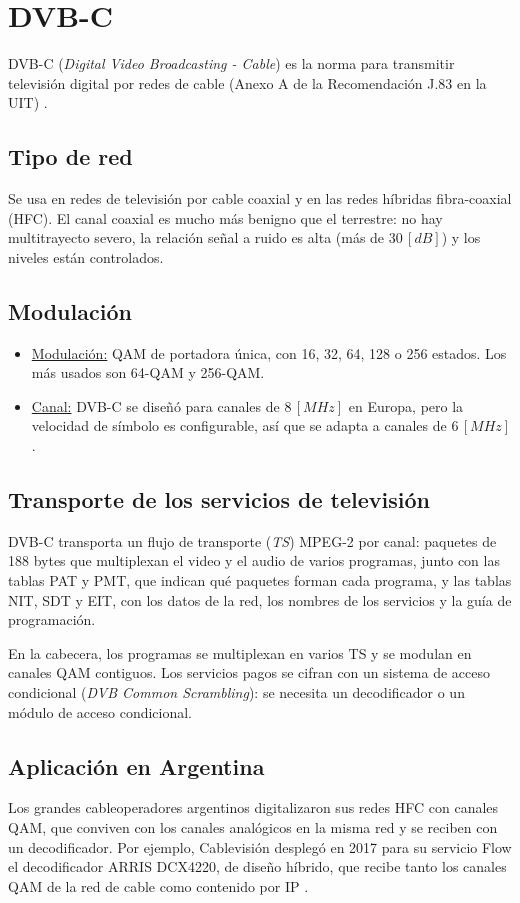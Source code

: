 \section{DVB-C}
\label{sec:dvbc}

DVB-C (\textit{Digital Video Broadcasting - Cable}) es la norma para transmitir televisión digital por redes de cable (Anexo A de la Recomendación J.83 en la UIT) \cite{itu_j83}.

\subsection{Tipo de red}
Se usa en redes de televisión por cable coaxial y en las redes híbridas fibra-coaxial (HFC). El canal coaxial es mucho más benigno que el terrestre: no hay multitrayecto severo, la relación señal a ruido es alta (más de $30 \, [dB]$) y los niveles están controlados.

\subsection{Modulación}
\begin{itemize}
    \item \underline{Modulación:} QAM de portadora única, con 16, 32, 64, 128 o 256 estados. Los más usados son 64-QAM y 256-QAM.
    \item \underline{Canal:} DVB-C se diseñó para canales de $8 \, [MHz]$ en Europa, pero la velocidad de símbolo es configurable, así que se adapta a canales de $6 \, [MHz]$.
\end{itemize}

\subsection{Transporte de los servicios de televisión}
DVB-C transporta un flujo de transporte (\textit{TS}) MPEG-2 por canal: paquetes de 188 bytes que multiplexan el video y el audio de varios programas, junto con las tablas PAT y PMT, que indican qué paquetes forman cada programa, y las tablas NIT, SDT y EIT, con los datos de la red, los nombres de los servicios y la guía de programación.

En la cabecera, los programas se multiplexan en varios TS y se modulan en canales QAM contiguos. Los servicios pagos se cifran con un sistema de acceso condicional (\textit{DVB Common Scrambling}): se necesita un decodificador o un módulo de acceso condicional.

\subsection{Aplicación en Argentina}
Los grandes cableoperadores argentinos digitalizaron sus redes HFC con canales QAM, que conviven con los canales analógicos en la misma red y se reciben con un decodificador. Por ejemplo, Cablevisión desplegó en 2017 para su servicio Flow el decodificador ARRIS DCX4220, de diseño híbrido, que recibe tanto los canales QAM de la red de cable como contenido por IP \cite{lightwave_flow}.

